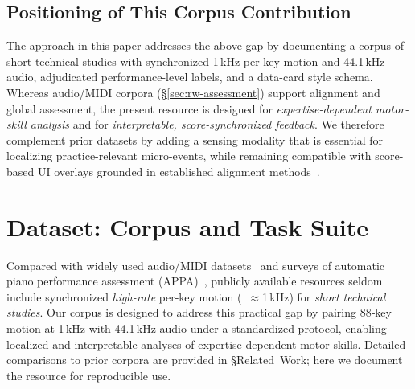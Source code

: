 \documentclass[sigconf,review,anonymous]{acmart}
\begin{document}
\subsection{Positioning of This Corpus Contribution}
The approach in this paper addresses the above gap by documenting a corpus of short technical studies with synchronized 1\,kHz per-key motion and 44.1\,kHz audio, adjudicated performance-level labels, and a data-card style schema. Whereas audio/MIDI corpora (\S\ref{sec:rw-assessment}) support alignment and global assessment, the present resource is designed for \emph{expertise-dependent motor-skill analysis} and for \emph{interpretable, score-synchronized feedback}. We therefore complement prior datasets by adding a sensing modality that is essential for localizing practice-relevant micro-events, while remaining compatible with score-based UI overlays grounded in established alignment methods~\cite{nakamura2016}.






\section{Dataset: Corpus and Task Suite}
\label{sec:dataset}

Compared with widely used audio/MIDI datasets~\cite{Hawthorne2019MAESTRO,Emiya2010MAPS,Foscarin2020ASAP} and surveys of automatic piano performance assessment (APPA)~\cite{Kim2022APPA}, publicly available resources seldom include synchronized \emph{high‑rate} per‑key motion (~$\approx$1\,kHz) for \emph{short technical studies}. Our corpus is designed to address this practical gap by pairing 88‑key motion at 1\,kHz with 44.1\,kHz audio under a standardized protocol, enabling localized and interpretable analyses of expertise‑dependent motor skills. Detailed comparisons to prior corpora are provided in §Related~Work; here we document the resource for reproducible use.
\end{document}
